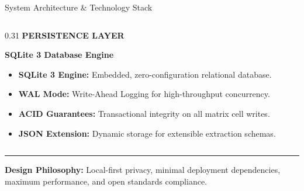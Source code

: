 \documentclass[aspectratio=169,10pt]{beamer}
\begin{document}
\begin{frame}{System Architecture \& Technology Stack}
\begin{columns}[T]
  \begin{column}{0.31\textwidth}
    {\fontsize{7pt}{8.5pt}\selectfont\bfseries\color{SubText} PERSISTENCE LAYER}\par\vspace{2pt}
    {\fontsize{9.5pt}{11.5pt}\selectfont\bfseries\color{DarkText} SQLite 3 Database Engine}\par\vspace{4pt}
    {\fontsize{7.2pt}{9.2pt}\selectfont\color{DarkText}
    \begin{itemize}
      \item \textbf{SQLite 3 Engine:} Embedded, zero-configuration relational database.
      \item \textbf{WAL Mode:} Write-Ahead Logging for high-throughput concurrency.
      \item \textbf{ACID Guarantees:} Transactional integrity on all matrix cell writes.
      \item \textbf{JSON Extension:} Dynamic storage for extensible extraction schemas.
    \end{itemize}}
  \end{column}
\end{columns}

\vspace{0.45cm}
\rule{14.2cm}{0.4pt}\par\vspace{0.12cm}
{\centering\fontsize{7pt}{8.5pt}\selectfont\color{DarkText}
\textbf{Design Philosophy:} Local-first privacy, minimal deployment dependencies, maximum performance, and open standards compliance.\par}
\end{frame}
\end{document}
